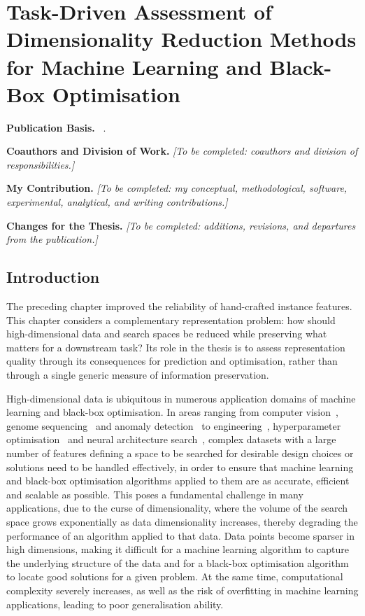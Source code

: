 \providecommand{\Description}[1]{}
\chapter{Task-Driven Assessment of Dimensionality Reduction Methods for Machine Learning and Black-Box Optimisation}\label{ch:ch05:dim_red}
\begingroup\small
\noindent\textbf{Publication Basis.} ~\citep{ShaEtAl25}.\par
\noindent\textbf{Coauthors and Division of Work.} \emph{[To be completed: coauthors and division of responsibilities.]}\par
\noindent\textbf{My Contribution.} \emph{[To be completed: my conceptual, methodological, software, experimental, analytical, and writing contributions.]}\par
\noindent\textbf{Changes for the Thesis.} \emph{[To be completed: additions, revisions, and departures from the publication.]}\par
\endgroup\medskip

\section{Introduction}
\label{sec:ch05:intro}

The preceding chapter improved the reliability of hand-crafted instance features. This chapter considers a complementary representation problem: how should high-dimensional data and search spaces be reduced while preserving what matters for a downstream task? Its role in the thesis is to assess representation quality through its consequences for prediction and optimisation, rather than through a single generic measure of information preservation.

High-dimensional data is ubiquitous in numerous application domains of machine learning and black-box optimisation.
In areas ranging from computer vision~\citep{SchEtAl15}, genome sequencing~\citep{VanEtAl22} and anomaly detection~\citep{TalEtAl21} to engineering~\citep{PreEtAl24}, hyperparameter optimisation~\citep{SehEtAl22} and neural architecture search~\citep{ElsEtAl19}, complex datasets with a large number of features defining
a space to be searched for desirable design choices or solutions
need to be handled effectively, in order to ensure that machine learning and  black-box optimisation algorithms applied to them are as accurate, efficient and scalable as possible.
This poses a fundamental challenge in many applications, due to the curse of dimensionality, where the volume of the search space grows exponentially as data dimensionality increases, thereby degrading the performance of an algorithm applied to that data.
Data points become sparser in high dimensions, making it difficult for a machine learning algorithm to capture the underlying structure of the data and for a  black-box optimisation algorithm to locate good solutions for a given problem.
At the same time, computational complexity severely increases, as well as the risk of overfitting in machine learning applications, leading to poor generalisation ability.

